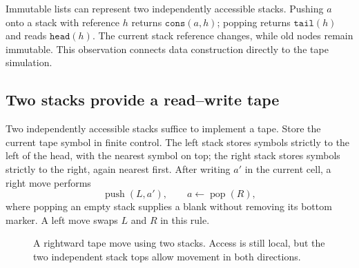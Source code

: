 \documentclass[11pt,twoside]{article}
\theoremstyle{definition}
\theoremstyle{remark}
\begin{document}
Immutable lists can represent two independently accessible stacks. Pushing
$a$ onto a stack with reference $h$ returns $\mathtt{cons}(a,h)$; popping
returns $\mathtt{tail}(h)$ and reads $\mathtt{head}(h)$. The current stack
reference changes, while old nodes remain immutable. This observation
connects data construction directly to the tape simulation.

\subsection{Two stacks provide a read--write tape}

Two independently accessible stacks suffice to implement a tape. Store
the current tape symbol in finite control. The left stack stores symbols
strictly to the left of the head, with the nearest symbol on top; the right
stack stores symbols strictly to the right, again nearest first.
After writing $a'$ in the current cell, a right move performs
\begin{equation}
 \operatorname{push}(L,a'),\qquad
 a\leftarrow\operatorname{pop}(R),
 \label{eq:two-stack-right}
\end{equation}
where popping an empty stack supplies a blank without removing its bottom
marker. A left move swaps $L$ and $R$ in this rule.

\begin{figure}[htbp]
\centering
{}
\caption{A rightward tape move using two stacks. Access is still local,
but the two independent stack tops allow movement in both directions.}
\label{fig:two-stacks}
\end{figure}
\end{document}
